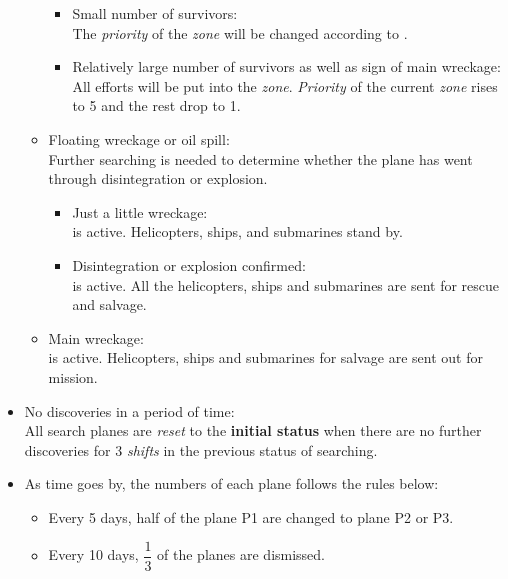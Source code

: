 \documentclass[a4paper,11pt]{article}
\begin{document}
\begin{spacing}{1.0}
\begin{itemize}
\begin{itemize}
		\begin{itemize}
			\item Small number of survivors:
			\\The \textit{priority} of the \textit{zone} will be changed according to .
			
			\item Relatively large number of survivors  as well as sign of main wreckage:
			\\All efforts will be put into the \textit{zone}. \textit{Priority} of the current \textit{zone} rises to 5 and the rest drop to 1.
		\end{itemize}
		
		\item Floating wreckage or oil spill:
		\\Further searching is needed to determine whether the plane has went through disintegration or explosion.
		\begin{itemize}
			\item Just a little wreckage:
			\\ is active. Helicopters, ships, and submarines stand by.
			\item Disintegration or explosion confirmed:
			\\ is active. All the helicopters, ships and submarines are sent for rescue and salvage.
		\end{itemize}
		
		\item Main wreckage:
		\\ is active. Helicopters, ships and submarines for salvage are sent out for mission.
		
	\end{itemize}
	\item No discoveries in a period of time:
	\\All search planes are \textit{reset} to the \textbf{initial status} when there are no further discoveries for 3 \textit{shifts} in the previous status of searching.
	
	\item As time goes by, the numbers of each plane follows the rules below:
	\begin{itemize}
		\item 	Every 5 days, half of the plane P1 are changed to plane P2 or P3.
		\item Every 10 days, $\dfrac{1}{3}$ of the planes are dismissed.
	\end{itemize}
\end{itemize}












\end{spacing}
\end{document}
